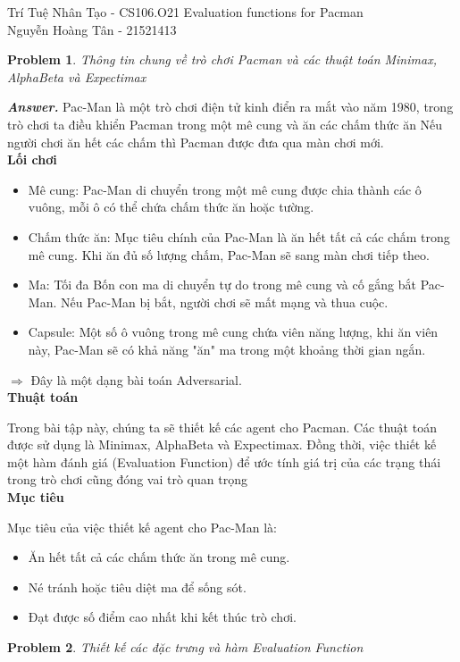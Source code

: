 \documentclass[12pt]{article}
\newtheorem{problem}{Problem}
\newenvironment{solution}[1][\it{Answer}]{\textbf{#1. } }{}
\begin{document}
\graphicspath{ {Figs/} } 

\noindent Trí Tuệ Nhân Tạo - CS106.O21 \hfill Evaluation functions for Pacman \\
Nguyễn Hoàng Tân - 21521413

\hrulefill


\begin{problem}
	Thông tin chung về trò chơi Pacman và các thuật toán Minimax, AlphaBeta và Expectimax
\end{problem}

\begin{solution}
    Pac-Man là một trò chơi điện tử kinh điển ra mắt vào năm 1980, trong trò chơi ta điều khiển Pacman trong một mê
    cung và ăn các chấm thức ăn Nếu người chơi ăn hết các chấm
    thì Pacman được đưa qua màn chơi mới.  \\
    
\hspace{-1em}\textbf{Lối chơi}
\begin{itemize}
    \item Mê cung: Pac-Man di chuyển trong một mê cung được chia thành các ô vuông, mỗi ô có thể chứa chấm thức ăn hoặc tường.
    \item Chấm thức ăn: Mục tiêu chính của Pac-Man là ăn hết tất cả các chấm trong mê cung. Khi ăn đủ số lượng chấm, Pac-Man sẽ sang màn chơi tiếp theo.
    \item Ma: Tối đa Bốn con ma di chuyển tự do trong mê cung và cố gắng bắt Pac-Man. Nếu Pac-Man bị bắt, người chơi sẽ mất mạng và thua cuộc.
    \item Capsule: Một số ô vuông trong mê cung chứa viên năng lượng, khi ăn viên này, Pac-Man sẽ có khả năng "ăn" ma trong một khoảng thời gian ngắn.
\end{itemize}
    $\Rightarrow$ Đây là một dạng bài toán Adversarial. \\

\hspace{-1em}\textbf{Thuật toán}

Trong bài tập này, chúng ta sẽ thiết kế các agent cho Pacman. Các thuật toán
được sử dụng là Minimax, AlphaBeta và Expectimax. Đồng thời, việc thiết kế một hàm đánh giá (Evaluation Function) để ước tính giá trị của các trạng thái trong trò chơi cũng đóng vai trò quan trọng \\

\hspace{-1em}\textbf{Mục tiêu}

Mục tiêu của việc thiết kế agent cho Pac-Man là:
\begin{itemize}
    \item Ăn hết tất cả các chấm thức ăn trong mê cung.
    \item Né tránh hoặc tiêu diệt ma để sống sót.
    \item Đạt được số điểm cao nhất khi kết thúc trò chơi.
\end{itemize}


\end{solution}
\begin{problem}
    Thiết kế các đặc trưng và hàm Evaluation Function
\end{problem}
\end{document}

